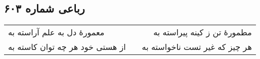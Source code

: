 \begin{center}
\section*{رباعی شماره ۶۰۳}
\label{sec:sh603}
\begin{longtable}{l p{0.5cm} r}
معمورهٔ دل به علم آراسته به
&&
مطمورهٔ تن ز کینه پیراسته به
\\
از هستی خود هر چه توان کاسته به
&&
هر چیز که غیر تست ناخواسته به
\\
\end{longtable}
\end{center}
